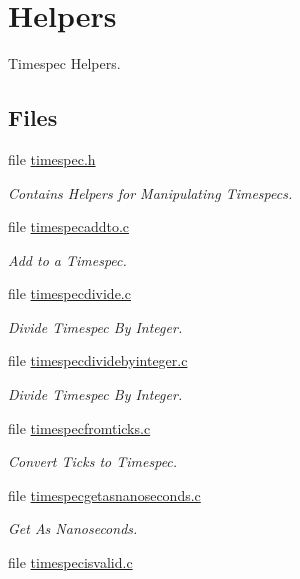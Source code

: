 \hypertarget{group__Timespec}{}\section{Helpers}
\label{group__Timespec}


Timespec Helpers.  


\subsection*{Files}
\begin{DoxyCompactItemize}
\item 
file \mbox{\hyperlink{score_2timespec_8h}{timespec.\+h}}
\begin{DoxyCompactList}\small\item\em Contains Helpers for Manipulating Timespecs. \end{DoxyCompactList}\item 
file \mbox{\hyperlink{timespecaddto_8c}{timespecaddto.\+c}}
\begin{DoxyCompactList}\small\item\em Add to a Timespec. \end{DoxyCompactList}\item 
file \mbox{\hyperlink{timespecdivide_8c}{timespecdivide.\+c}}
\begin{DoxyCompactList}\small\item\em Divide Timespec By Integer. \end{DoxyCompactList}\item 
file \mbox{\hyperlink{timespecdividebyinteger_8c}{timespecdividebyinteger.\+c}}
\begin{DoxyCompactList}\small\item\em Divide Timespec By Integer. \end{DoxyCompactList}\item 
file \mbox{\hyperlink{timespecfromticks_8c}{timespecfromticks.\+c}}
\begin{DoxyCompactList}\small\item\em Convert Ticks to Timespec. \end{DoxyCompactList}\item 
file \mbox{\hyperlink{timespecgetasnanoseconds_8c}{timespecgetasnanoseconds.\+c}}
\begin{DoxyCompactList}\small\item\em Get As Nanoseconds. \end{DoxyCompactList}\item 
file \mbox{\hyperlink{timespecisvalid_8c}{timespecisvalid.\+c}}

\end{DoxyCompactItemize}
